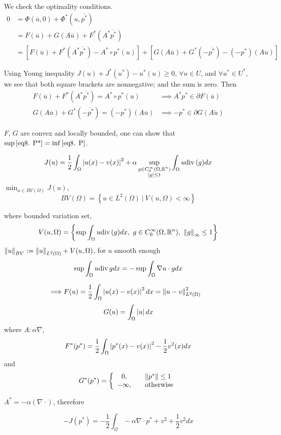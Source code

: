 We check the optimality conditions.
\begin{align*}
	0&=\Phi (\overline{u},0)+\Phi^*(u, \overline{p^*}) \\
	&= F(\overline{u})+G(A\overline{u})+F^*(A^*\overline{p^*})\\
	&= [F(\overline{u})+F^*(A^*\overline{p^*})-A^*\circ p^*(u)]+[G(A\overline{u})+G^*(-\overline{p^*})-(-p^*)(A\overline{u})]
\end{align*}

Using Young inequality $J(u)+J^*(u^*)-u^*(u)\geq 0$, $\forall u \in U$, and $\forall u^* \in U^*$, we see that both square brackets are nonnegative; and the sum is zero. Then
\begin{align*}
	F(\overline{u})+F^*(A^*\overline{p^*})=A^*\circ p^*(u) &\implies A^*p^* \in \partial F(\overline{u}) \\
	G(A\overline{u})+G^*(-\overline{p^*})=(-p^*)(A\overline{u}) &\implies -p^* \in \partial G(A\overleftarrow{u})
\end{align*}

$F$, $G$ are convex and locally bounded, one can show that 
$\sup\eqref{eq8. P*}=\inf\eqref{eq8. P}$.
\begin{example}
	\begin{equation*}
		J(u)=\frac{1}{2} \int_{\Omega}\left|u(x)-v(x)\right|^2+\alpha \sup_{\substack{g\in C_0^\infty(\Omega, \mathbb{R}^n) \\ \left|g\right|\leq 1}} \int_{\Omega} u \mathrm{div\,} (g) dx
	\end{equation*}
	$\min_{u\in BV(\Omega)} J(u)$, \[BV(\Omega)=\left\lbrace u\in L^2(\Omega) \ | \ V(u, \Omega) < \infty\right\rbrace\]
	
	where bounded variation set,
	\begin{equation*}
		V(u, \Omega)=\left\lbrace 
		\sup \int_{\Omega} u \mathrm{div\,} (g) dx, \ g \in C_0^\infty (\Omega, \mathbb{R}^n), \  \left\lVert g\right\rVert_\infty \leq 1
		\right\rbrace
	\end{equation*}
	$\left\lVert u\right\rVert_{BV}:= \left\lVert u\right\rVert_{L^2(\Omega)}+V(u, \Omega)$, for $u$ smooth enough 
	\[
		\sup \int_{\Omega} u \mathrm{div\,} g dx = -\sup \int_{\Omega} \nabla u \cdot g dx 
	\]
	
	\begin{align*}
		\implies & F(u)=\frac{1}{2}\int_{\Omega} \left|u(x)-v(x)\right|^2 dx = \left\lVert u-v\right\rVert_{L^2(\Omega)}^2
	\end{align*}
	\[G(u)=\int_{\Omega} \left|u\right|dx\]
	 where $A: \alpha \nabla$,
	\begin{align*}
		F^*(p^*)=\frac{1}{2} \int_{\Omega}\left|p^*(x)-v(x)\right| ^2 -\frac{1}{2} v^2(x) dx
	\end{align*}
	and 
	\[G^*(p^*) =\left\lbrace 
	\begin{array}{cl}
		0, &\quad \left\lVert p^*\right\rVert \leq 1 \\
	-\infty, &\quad \text{otherwise}
	\end{array}
	\right. \]
	
	$A^*=-\alpha (\nabla\cdot)$, therefore
	
	\[-J(p^*)=-\frac{1}{2} \int_{\Omega} -\alpha \nabla\cdot p^* + v^2+ \frac{1}{2} v^2 dx\]
\end{example}

